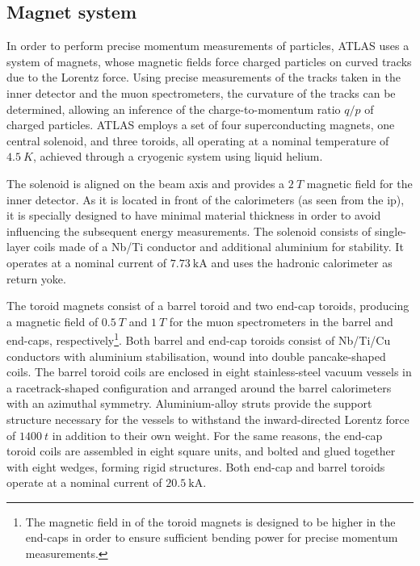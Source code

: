 \subsection{Magnet system}

In order to perform precise momentum measurements of particles, ATLAS uses a system of magnets, whose magnetic fields force charged particles on curved tracks due to the Lorentz force. Using precise measurements of the tracks taken in the inner detector and the muon spectrometers, the curvature of the tracks can be determined, allowing an inference of the charge-to-momentum ratio $q/p$ of charged particles. ATLAS employs a set of four superconducting magnets, one central solenoid, and three toroids, all operating at a nominal temperature of $\SI{4.5}{K}$, achieved through a cryogenic system using liquid helium. 

The solenoid is aligned on the beam axis and provides a $\SI{2}{T}$ magnetic field for the inner detector. As it is located in front of the calorimeters (as seen from the \gls{ip}), it is specially designed to have minimal material thickness in order to avoid influencing the subsequent energy measurements. The solenoid consists of single-layer coils made of a Nb/Ti conductor and additional aluminium for stability. It operates at a nominal current of $\SI{7.73}{\kilo\ampere}$ and uses the hadronic calorimeter as return yoke.

The toroid magnets consist of a barrel toroid and two end-cap toroids, producing a magnetic field of $\SI{0.5}{T}$ and $\SI{1}{T}$ for the muon spectrometers in the barrel and end-caps, respectively\footnote{The magnetic field in of the toroid magnets is designed to be higher in the end-caps in order to ensure sufficient bending power for precise momentum measurements.}. Both barrel and end-cap toroids consist of Nb/Ti/Cu conductors with aluminium stabilisation, wound into double pancake-shaped coils. The barrel toroid coils are enclosed in eight stainless-steel vacuum vessels in a racetrack-shaped configuration and arranged around the barrel calorimeters with an azimuthal symmetry. Aluminium-alloy struts provide the support structure necessary for the vessels to withstand the inward-directed Lorentz force of $\SI{1400}{t}$ in addition to their own weight. For the same reasons, the end-cap toroid coils are assembled in eight square units, and bolted and glued together with eight wedges, forming rigid structures. Both end-cap and barrel toroids operate at a nominal current of $\SI{20.5}{\kilo\ampere}$.

